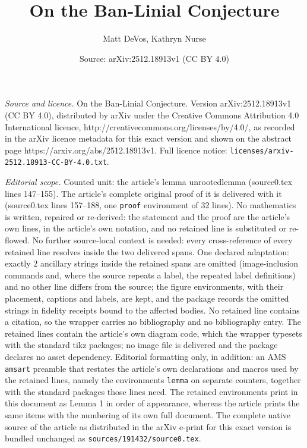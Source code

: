 \documentclass[10pt,a4paper]{amsart}
\title{On the Ban-Linial Conjecture}
\author{Matt DeVos, Kathryn Nurse}
\date{Source: arXiv:2512.18913v1 (CC BY 4.0)}
\begin{document}
\maketitle

\noindent\emph{Source and licence.} On the Ban-Linial Conjecture. Version arXiv:2512.18913v1 (CC BY 4.0), distributed by arXiv under the Creative Commons Attribution 4.0 International licence, http://creativecommons.org/licenses/by/4.0/, as recorded in the arXiv licence metadata for this exact version and shown on the abstract page https://arxiv.org/abs/2512.18913v1. Full licence notice: \texttt{licenses/arxiv-2512.18913-CC-BY-4.0.txt}.\par\smallskip

\noindent\textit{Editorial scope.} Counted unit: the article's lemma unrootedlemma (source0.tex lines 147--155). The article's complete original proof of it is delivered with it (source0.tex lines 157--188, one \texttt{proof} environment of 32 lines). No mathematics is written, repaired or re-derived: the statement and the proof are the article's own lines, in the article's own notation, and no retained line is substituted or re-flowed.  No further source-local context is needed: every cross-reference of every retained line resolves inside the two delivered spans.  One declared adaptation: exactly 2 ancillary strings inside the retained spans are omitted (image-inclusion commands and, where the source repeats a label, the repeated label definitions) and no other line differs from the source; the figure environments, with their placement, captions and labels, are kept, and the package records the omitted strings in fidelity receipts bound to the affected bodies.  No retained line contains a citation, so the wrapper carries no bibliography and no bibliography entry.  The retained lines contain the article's own diagram code, which the wrapper typesets with the standard tikz packages; no image file is delivered and the package declares no asset dependency.  Editorial formatting only, in addition: an AMS \texttt{amsart} preamble that restates the article's own declarations and macros used by the retained lines, namely the environments \texttt{lemma} on separate counters, together with the standard packages those lines need.  The retained environments print in this document as Lemma 1 in order of appearance, whereas the article prints the same items with the numbering of its own full document.  The complete native source of the article as distributed in the arXiv e-print for this exact version is bundled unchanged as \texttt{sources/191432/source0.tex}.
\end{document}
